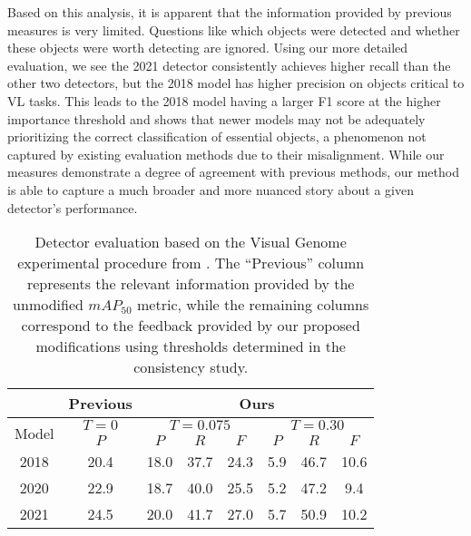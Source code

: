 \documentclass[10pt,twocolumn,letterpaper]{article}
\begin{document}
\par
Based on this analysis, it is apparent that the information provided by previous measures is very limited. Questions like which objects were detected and whether these objects were worth detecting are ignored. 
Using our more detailed evaluation, we see the 2021 detector consistently achieves higher recall than the other two detectors, but the 2018 model has higher precision on objects critical to VL tasks. This leads to the 2018 model having a larger F1 score at the higher importance threshold and shows that newer models may not be adequately prioritizing the correct classification of essential objects, a phenomenon not captured by existing evaluation methods due to their misalignment. While our measures demonstrate a degree of agreement with previous methods, our method is able to capture a much broader and more nuanced story about a given detector's performance.
\begin{table}[t!]
\footnotesize
\centering %
\begin{tabular}{c|c|c|c|c|c|c|c}
\hline
& Previous &\multicolumn{6}{c}{Ours} \\
\hline
\multirow{2}{*}{\!\!Model} & $T\!\!=\!0$ & \multicolumn{3}{c|}{$T\!\!=\!0.075$} & \multicolumn{3}{c}{$T\!\!=\!0.30$}\\
& $P$ & $P$ & $R$ & $F$ & $P$ & $R$ & $F$\\
\hline
2018 \cite{motifs2018} & 20.4 & 18.0 & 37.7 & 24.3 & 5.9 & 46.7 & 10.6\\
2020 \cite{unbiased2020} & 22.9 & 18.7 & 40.0 & 25.5 & 5.2 & 47.2 & 9.4 \\
2021 \cite{sgg2021} & 24.5 & 20.0 & 41.7 & 27.0 & 5.7 & 50.9 & 10.2\\
\hline
\end{tabular}
\vspace{1px}
\caption{Detector evaluation based on the Visual Genome experimental procedure from \cite{sgbase2017}. The ``Previous'' column represents the relevant information provided by the unmodified $mAP_{50}$ metric, while the remaining columns correspond to the feedback provided by our proposed modifications using thresholds determined in the consistency study.} %
\label{table:detector_compare} %
\end{table}
\end{document}
